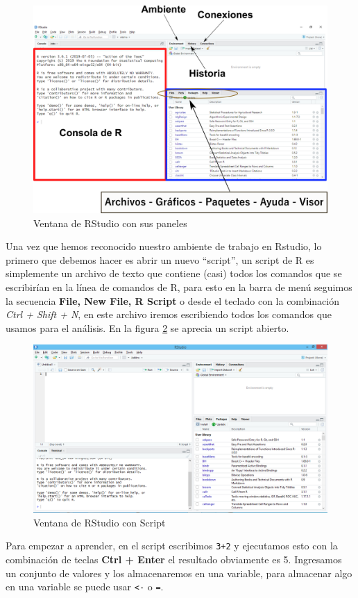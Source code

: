 \documentclass[letterpaper,]{book}
\begin{document}
\begin{figure}[h!]

{\centering \includegraphics[width=0.5\linewidth]{rstudiotabs} 

}

\caption{Ventana de RStudio con sus paneles}\label{fig:rstudiotabs}
\end{figure}

Una vez que hemos reconocido nuestro ambiente de trabajo en Rstudio, lo primero que debemos hacer es abrir un nuevo ``script'', un script de R es simplemente un archivo de texto que contiene (casi) todos los comandos que se escribirían en la línea de comandos de R, para esto en la barra de menú seguimos la secuencia \textbf{File, New File, R Script} o desde el teclado con la combinación \emph{Ctrl + Shift + N}, en este archivo iremos escribiendo todos los comandos que usamos para el análisis. En la figura \ref{fig:rstudio2} se aprecia un script abierto.

\begin{figure}[h!]

{\centering \includegraphics[width=0.5\linewidth]{rstudio2} 

}

\caption{Ventana de RStudio con Script}\label{fig:rstudio2}
\end{figure}

Para empezar a aprender, en el script escribimos \texttt{3+2} y ejecutamos esto con la combinación de teclas \textbf{Ctrl + Enter} el resultado obviamente es 5. Ingresamos un conjunto de valores y los almacenaremos en una variable, para almacenar algo en una variable se puede usar \texttt{\textless{}-} o \texttt{=}.
\end{document}

